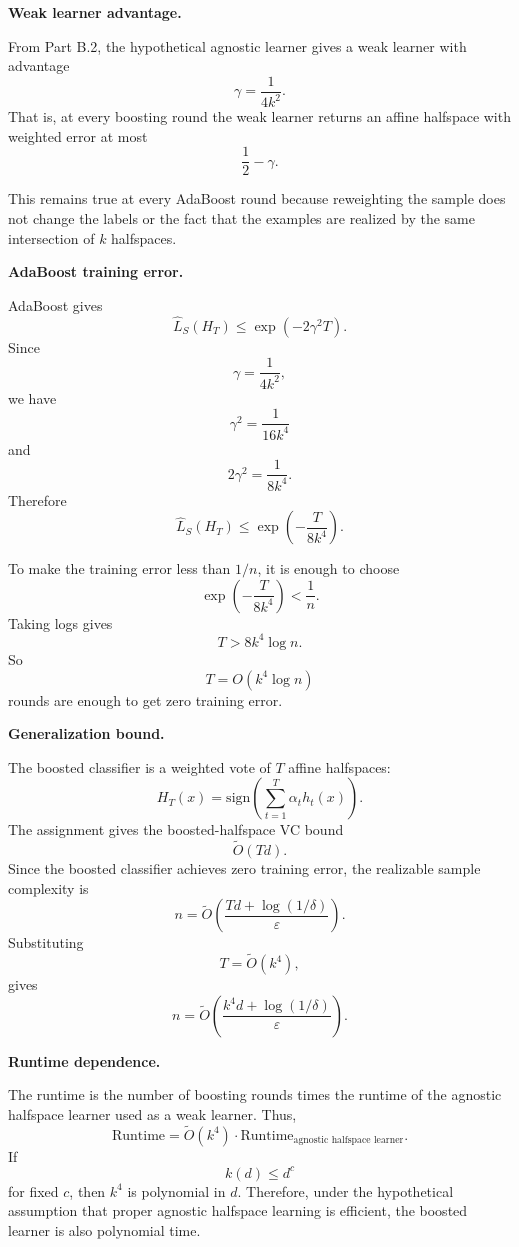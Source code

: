 \documentclass[11pt]{article}
\newcommand{\sign}{\mathrm{sign}}
\newcommand{\eps}{\varepsilon}
\begin{document}
\begin{enumerate}
    \begin{solutionbox}
    \textbf{Weak learner advantage.}

    From Part B.2, the hypothetical agnostic learner gives a weak learner with advantage
    \[
    \gamma=\frac{1}{4k^2}.
    \]
    That is, at every boosting round the weak learner returns an affine halfspace with weighted
    error at most
    \[
    \frac12-\gamma.
    \]

    This remains true at every AdaBoost round because reweighting the sample does not change the
    labels or the fact that the examples are realized by the same intersection of $k$ halfspaces.

    \medskip

    \textbf{AdaBoost training error.}

    AdaBoost gives
    \[
    \widehat L_S(H_T)
    \le
    \exp(-2\gamma^2T).
    \]
    Since
    \[
    \gamma=\frac{1}{4k^2},
    \]
    we have
    \[
    \gamma^2=\frac{1}{16k^4}
    \]
    and
    \[
    2\gamma^2=\frac{1}{8k^4}.
    \]
    Therefore
    \[
    \widehat L_S(H_T)
    \le
    \exp\left(-\frac{T}{8k^4}\right).
    \]

    To make the training error less than $1/n$, it is enough to choose
    \[
    \exp\left(-\frac{T}{8k^4}\right)<\frac1n.
    \]
    Taking logs gives
    \[
    T>8k^4\log n.
    \]
    So
    \[
    \boxed{
    T=O(k^4\log n)
    }
    \]
    rounds are enough to get zero training error.

    \medskip

    \textbf{Generalization bound.}

    The boosted classifier is a weighted vote of $T$ affine halfspaces:
    \[
    H_T(x)=\sign\left(\sum_{t=1}^T\alpha_t h_t(x)\right).
    \]
    The assignment gives the boosted-halfspace VC bound
    \[
    \widetilde O(Td).
    \]
    Since the boosted classifier achieves zero training error, the realizable sample complexity is
    \[
    n
    =
    \widetilde O\left(
    \frac{Td+\log(1/\delta)}{\eps}
    \right).
    \]
    Substituting
    \[
    T=\widetilde O(k^4),
    \]
    gives
    \[
    \boxed{
    n
    =
    \widetilde O\left(
    \frac{k^4d+\log(1/\delta)}{\eps}
    \right).
    }
    \]

    \medskip

    \textbf{Runtime dependence.}

    The runtime is the number of boosting rounds times the runtime of the agnostic halfspace
    learner used as a weak learner. Thus,
    \[
    \text{Runtime}
    =
    \widetilde O(k^4)\cdot
    \text{Runtime}_{\text{agnostic halfspace learner}}.
    \]
    If
    \[
    k(d)\le d^c
    \]
    for fixed $c$, then $k^4$ is polynomial in $d$. Therefore, under the hypothetical assumption
    that proper agnostic halfspace learning is efficient, the boosted learner is also polynomial
    time.
    \end{solutionbox}


\end{enumerate}
\end{document}
